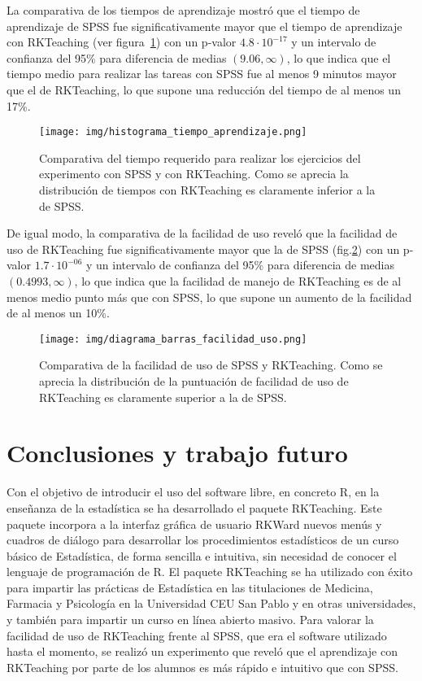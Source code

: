 \documentclass[10pt,twoside,spanish]{article}
\numberwithin{equation}{section}
\begin{document}
La comparativa de los tiempos de aprendizaje mostró que el tiempo de aprendizaje de SPSS fue significativamente mayor que el tiempo de
aprendizaje con RKTeaching (ver figura~\ref{g:tiempo_aprendizaje}) con un p-valor  $4.8\cdot 10^{-17}$ y un intervalo de
confianza del 95\% para diferencia de medias $(9.06, \infty)$, lo que indica que el tiempo medio para realizar las tareas con SPSS fue al menos 9 minutos mayor que el de
RKTeaching, lo que supone una reducción del tiempo de al menos un 17\%.

\begin{figure}[htp]
\begin{center}
  \texttt{[image: img/histograma\_tiempo\_aprendizaje.png]}
  \caption{Comparativa del tiempo requerido para realizar los ejercicios del experimento con SPSS y con RKTeaching. Como se aprecia la
  distribución de tiempos con RKTeaching es claramente inferior a la de SPSS.}
  \label{g:tiempo_aprendizaje}
\end{center}
\end{figure}

De igual modo, la comparativa de la facilidad de uso reveló que la facilidad de uso de RKTeaching fue significativamente mayor que la de
SPSS (fig.\ref{g:facilidad_uso}) con un p-valor $1.7\cdot 10^{-06}$ y un intervalo de confianza del 95\% para diferencia de medias $(0.4993,
\infty)$, lo que indica que la facilidad de manejo de RKTeaching es de al menos medio punto más que con SPSS, lo que supone un aumento de la facilidad
de al menos un 10\%.

\begin{figure}[htp]
\begin{center}
  \texttt{[image: img/diagrama\_barras\_facilidad\_uso.png]}
  \caption{Comparativa de la facilidad de uso de SPSS y RKTeaching. Como se
  aprecia la distribución de la puntuación de facilidad de uso de RKTeaching es claramente superior a la de SPSS.}
  \label{g:facilidad_uso}
\end{center}
\end{figure}

\section{Conclusiones y trabajo futuro}
Con el objetivo de introducir el uso del software libre, en concreto R, en la enseñanza de la estadística se ha
desarrollado el paquete RKTeaching. Este paquete incorpora a la interfaz gráfica de usuario RKWard nuevos menús y
cuadros de diálogo para desarrollar los procedimientos estadísticos de un curso básico de Estadística, de forma sencilla
e intuitiva, sin necesidad de conocer el lenguaje de programación de R.
El paquete RKTeaching se ha utilizado con éxito para impartir las prácticas de Estadística en las titulaciones de
Medicina, Farmacia y Psicología en la Universidad CEU San Pablo y en otras universidades, y también para impartir un
curso en línea abierto masivo.
Para valorar la facilidad de uso de RKTeaching frente al SPSS, que era el software utilizado hasta el momento, se
realizó un experimento que reveló que el aprendizaje con RKTeaching por parte de los alumnos es más rápido e intuitivo
que con SPSS.
\end{document}
